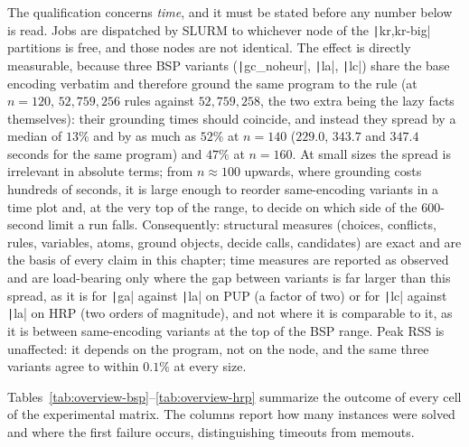 The qualification concerns \emph{time}, and it must be stated before any number below is read. Jobs are dispatched by SLURM to whichever node of the \texttt|kr,kr-big| partitions is free, and those nodes are not identical. The effect is directly measurable, because three BSP variants (\texttt|gc_noheur|, \texttt|la|, \texttt|lc|) share the base encoding verbatim and therefore ground the same program to the rule (at $n=120$, $52{,}759{,}256$ rules against $52{,}759{,}258$, the two extra being the lazy facts themselves): their grounding times should coincide, and instead they spread by a median of $13\%$ and by as much as $52\%$ at $n=140$ ($229.0$, $343.7$ and $347.4$ seconds for the same program) and $47\%$ at $n=160$. At small sizes the spread is irrelevant in absolute terms; from $n \approx 100$ upwards, where grounding costs hundreds of seconds, it is large enough to reorder same-encoding variants in a time plot and, at the very top of the range, to decide on which side of the 600-second limit a run falls. Consequently: structural measures (choices, conflicts, rules, variables, atoms, ground objects, decide calls, candidates) are exact and are the basis of every claim in this chapter; time measures are reported as observed and are load-bearing only where the gap between variants is far larger than this spread, as it is for \texttt|ga| against \texttt|la| on PUP (a factor of two) or for \texttt|lc| against \texttt|la| on HRP (two orders of magnitude), and not where it is comparable to it, as it is between same-encoding variants at the top of the BSP range. Peak RSS is unaffected: it depends on the program, not on the node, and the same three variants agree to within $0.1\%$ at every size.

Tables~\ref{tab:overview-bsp}--\ref{tab:overview-hrp} summarize the outcome of every cell of the experimental matrix. The columns report how many instances were solved and where the first failure occurs, distinguishing timeouts from memouts.

